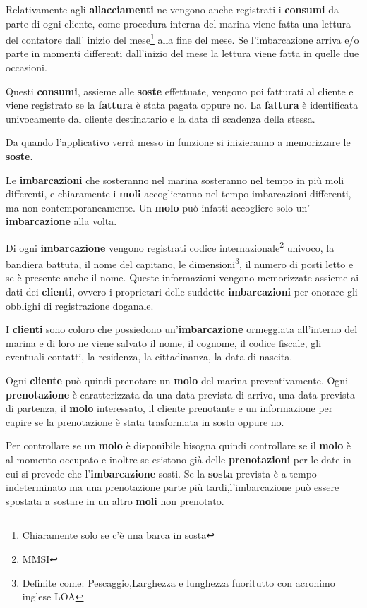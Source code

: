 Relativamente agli \textbf{allacciamenti} ne vengono anche registrati i \textbf{consumi} da parte di ogni cliente, come procedura interna del marina viene fatta una lettura del contatore dall' inizio del mese\footnote{Chiaramente solo se c'è una barca in sosta} alla fine del mese. Se l'imbarcazione arriva e/o parte in momenti differenti dall'inizio del mese la lettura viene fatta in quelle due occasioni.

Questi \textbf{consumi}, assieme alle \textbf{soste} effettuate, vengono poi fatturati al cliente e viene registrato se la \textbf{fattura} è stata pagata oppure no.
La \textbf{fattura} è identificata univocamente dal cliente destinatario e la data di scadenza della stessa.

Da quando l'applicativo verrà messo in funzione si inizieranno a memorizzare le \textbf{soste}.

Le \textbf{imbarcazioni} che sosteranno nel marina sosteranno nel tempo in più moli differenti, e chiaramente i \textbf{moli} accoglieranno nel tempo imbarcazioni differenti, ma non contemporaneamente. Un \textbf{molo} può infatti accogliere solo un' \textbf{imbarcazione} alla volta.

Di ogni \textbf{imbarcazione} vengono registrati codice internazionale\footnote{MMSI} univoco, la bandiera battuta, il nome del capitano, le dimensioni\footnote{Definite come: Pescaggio,Larghezza e lunghezza fuoritutto con acronimo inglese LOA}, il numero di posti letto e se è presente anche il nome. Queste informazioni vengono memorizzate assieme ai dati dei \textbf{clienti}, ovvero i proprietari delle suddette \textbf{imbarcazioni} per onorare gli obblighi di registrazione doganale.

I \textbf{clienti} sono coloro che possiedono un'\textbf{imbarcazione} ormeggiata all'interno del marina e di loro ne viene salvato il nome, il cognome, il codice fiscale, gli eventuali contatti, la residenza, la cittadinanza, la data di nascita.

Ogni \textbf{cliente} può quindi prenotare un \textbf{molo} del marina preventivamente. Ogni \textbf{prenotazione} è caratterizzata da una data prevista di arrivo, una data prevista di partenza, il \textbf{molo} interessato, il cliente prenotante e un informazione per capire se la prenotazione è stata trasformata in sosta oppure no.

Per controllare se un \textbf{molo} è disponibile bisogna quindi controllare se il \textbf{molo} è al momento occupato e inoltre se esistono già delle \textbf{prenotazioni} per le date in cui si prevede che l'\textbf{imbarcazione} sosti. Se la \textbf{sosta} prevista è a tempo indeterminato ma una prenotazione parte più tardi,l'imbarcazione può essere spostata a sostare in un altro \textbf{moli} non prenotato.

